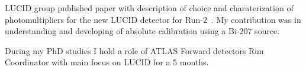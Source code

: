 LUCID group published paper with description of choice and charaterization of photomultipliers for the new LUCID detector for Run-2~\cite{Alberghi:2016tad}.
My contribution was in understanding and developing of absolute calibration using a Bi-207 source.

During my PhD studies I hold a role of ATLAS Forward detectors Run Coordinator with main focus on LUCID for a 5 months.


% 
%  
% 
%  
%  
